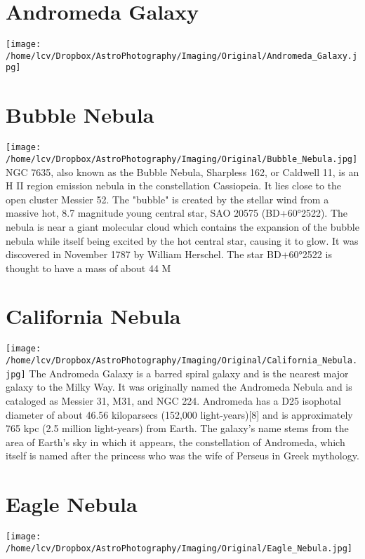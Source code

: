 \newpage\pagecolor{black}\color{white}
\section{Andromeda Galaxy}
\texttt{[image: /home/lcv/Dropbox/AstroPhotography/Imaging/Original/Andromeda\_Galaxy.jpg]}
{\footnotesize\color{white}

}
\section{Bubble Nebula}
\texttt{[image: /home/lcv/Dropbox/AstroPhotography/Imaging/Original/Bubble\_Nebula.jpg]}
{\footnotesize\color{white}
NGC 7635, also known as the Bubble Nebula, Sharpless 162, or Caldwell 11, is an H II region emission nebula in the constellation Cassiopeia. It lies close to the open cluster Messier 52. The "bubble" is created by the stellar wind from a massive hot, 8.7 magnitude young central star, SAO 20575 (BD+60°2522). The nebula is near a giant molecular cloud which contains the expansion of the bubble nebula while itself being excited by the hot central star, causing it to glow. It was discovered in November 1787 by William Herschel. The star BD+60°2522 is thought to have a mass of about 44 M 
}
\section{California Nebula}
\texttt{[image: /home/lcv/Dropbox/AstroPhotography/Imaging/Original/California\_Nebula.jpg]}
{\footnotesize\color{white}
The Andromeda Galaxy is a barred spiral galaxy and is the nearest major galaxy to the Milky Way. It was originally named the Andromeda Nebula and is cataloged as Messier 31, M31, and NGC 224. Andromeda has a D25 isophotal diameter of about 46.56 kiloparsecs (152,000 light-years)[8] and is approximately 765 kpc (2.5 million light-years) from Earth. The galaxy's name stems from the area of Earth's sky in which it appears, the constellation of Andromeda, which itself is named after the princess who was the wife of Perseus in Greek mythology. 
}
\section{Eagle Nebula}
\texttt{[image: /home/lcv/Dropbox/AstroPhotography/Imaging/Original/Eagle\_Nebula.jpg]}
{\footnotesize\color{white}

}
